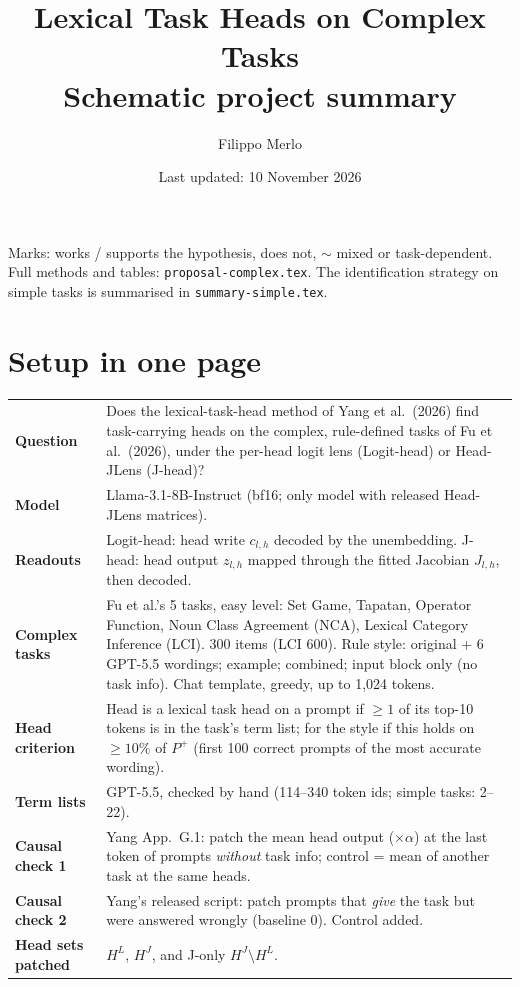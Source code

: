 \documentclass[10pt,a4paper]{article}
\title{Lexical Task Heads on Complex Tasks\\\large Schematic project summary}
\author{Filippo Merlo}
\date{Last updated: 10 November 2026}
\newcommand{\yes}{\textcolor{green!45!black}{\ding{51}}}
\newcommand{\no}{\textcolor{red!70!black}{\ding{55}}}
\newcommand{\mixed}{\textcolor{orange!80!black}{$\sim$}}
\begin{document}
\maketitle
\vspace{-1em}


\noindent Marks: \yes{} works / supports the hypothesis, \no{} does not, \mixed{} mixed or task-dependent. Full methods and tables: \texttt{proposal-complex.tex}. The identification strategy on simple tasks is summarised in \texttt{summary-simple.tex}.

\section{Setup in one page}

\begin{tabularx}{\textwidth}{@{}>{\raggedright\arraybackslash\bfseries}p{2.8cm}L@{}}
\toprule
Question & Does the lexical-task-head method of Yang et al.\ (2026) find task-carrying heads on the complex, rule-defined tasks of Fu et al.\ (2026), under the per-head logit lens (Logit-head) or Head-JLens (J-head)? \\
Model & Llama-3.1-8B-Instruct (bf16; only model with released Head-JLens matrices). \\
Readouts & Logit-head: head write $c_{l,h}$ decoded by the unembedding. J-head: head output $z_{l,h}$ mapped through the fitted Jacobian $J_{l,h}$, then decoded. \\
Complex tasks & Fu et al.'s 5 tasks, easy level: Set Game, Tapatan, Operator Function, Noun Class Agreement (NCA), Lexical Category Inference (LCI). 300 items (LCI 600). Rule style: original + 6 GPT-5.5 wordings; example; combined; input block only (no task info). Chat template, greedy, up to 1,024 tokens. \\
Head criterion & Head is a lexical task head on a prompt if $\geq 1$ of its top-10 tokens is in the task's term list; for the style if this holds on $\geq 10\%$ of $P^+$ (first 100 correct prompts of the most accurate wording). \\
Term lists & GPT-5.5, checked by hand (114--340 token ids; simple tasks: 2--22). \\
Causal check 1 & Yang App.~G.1: patch the mean head output ($\times\alpha$) at the last token of prompts \emph{without} task info; control = mean of another task at the same heads. \\
Causal check 2 & Yang's released script: patch prompts that \emph{give} the task but were answered wrongly (baseline 0). Control added. \\
Head sets patched & $H^L$, $H^J$, and J-only $H^J\setminus H^L$. \\
\bottomrule
\end{tabularx}
\end{document}
